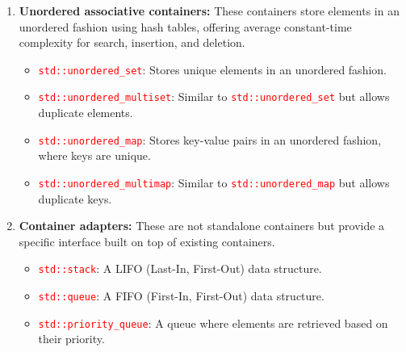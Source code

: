 \documentclass[12pt]{article}
\begin{document}
\begin{enumerate}
    \item \textbf{Unordered associative containers:} These containers store elements in an unordered fashion using hash tables, offering average constant-time complexity for search, insertion, and deletion.

    \begin{itemize}
        \item \textcolor{red}{\texttt{std::unordered\_set}}: Stores unique elements in an unordered fashion.
        \item \textcolor{red}{\texttt{std::unordered\_multiset}}: Similar to \textcolor{red}{\texttt{std::unordered\_set}} but allows duplicate elements.
        \item \textcolor{red}{\texttt{std::unordered\_map}}: Stores key-value pairs in an unordered fashion, where keys are unique.
        \item \textcolor{red}{\texttt{std::unordered\_multimap}}: Similar to \textcolor{red}{\texttt{std::unordered\_map}} but allows duplicate keys. 
    \end{itemize}

    \item \textbf{Container adapters:} These are not standalone containers but provide a specific interface built on top of existing containers.

    \begin{itemize}
        \item \textcolor{red}{\texttt{std::stack}}: A LIFO (Last-In, First-Out) data structure.
        \item \textcolor{red}{\texttt{std::queue}}: A FIFO (First-In, First-Out) data structure.
        \item \textcolor{red}{\texttt{std::priority\_queue}}: A queue where elements are retrieved based on their priority.
    \end{itemize}

\end{enumerate}
\end{document}
